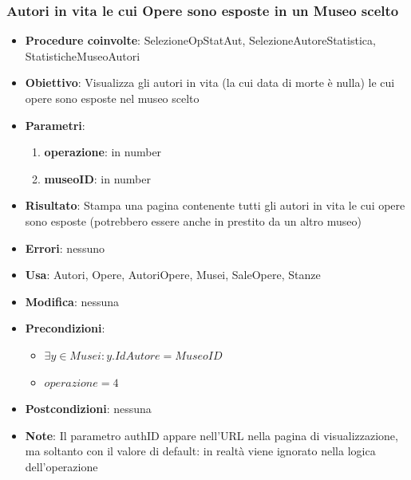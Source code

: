 \subsubsection{Autori in vita le cui Opere sono esposte in un Museo scelto}
\begin{itemize}
	\item \textbf{Procedure coinvolte}: SelezioneOpStatAut, SelezioneAutoreStatistica, 
	StatisticheMuseoAutori
	\item \textbf{Obiettivo}: Visualizza gli autori in vita (la cui data di morte è nulla)
	le cui opere sono esposte nel museo scelto
	\item \textbf{Parametri}:
	\begin{enumerate}
		\item \textbf{operazione}: in number
		\item \textbf{museoID}: in number
	\end{enumerate}
	\item \textbf{Risultato}: Stampa una pagina contenente tutti gli autori in vita
	 le cui opere sono esposte (potrebbero essere anche in prestito da un altro museo) 
	\item \textbf{Errori}: nessuno
	\item \textbf{Usa}: Autori, Opere, AutoriOpere, Musei, SaleOpere, Stanze
	\item \textbf{Modifica}: nessuna
	\item \textbf{Precondizioni}:
	\begin{itemize}
		\item $\exists y \in Musei : y.IdAutore = MuseoID$
		\item $operazione  = 4$
	\end{itemize}
	\item \textbf{Postcondizioni}: nessuna
	\item \textbf{Note}: Il parametro authID appare nell'URL nella pagina di 
	visualizzazione, ma soltanto con il valore di default: in realtà viene ignorato nella 
	logica dell'operazione
\end{itemize}